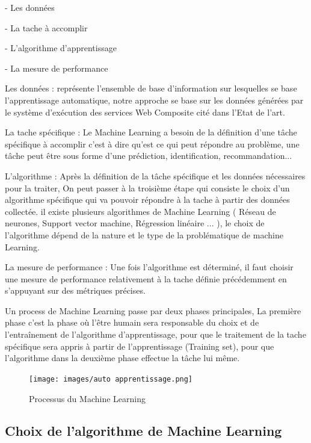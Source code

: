 - Les données

- La tache à accomplir 

- L'algorithme d'apprentissage

- La mesure de performance


Les données : représente l'ensemble de base d'information sur lesquelles se base l'apprentissage automatique, notre approche se base sur les données générées par le système d'exécution des services Web Composite cité dans l'Etat de l'art.

La tache spécifique : Le Machine Learning a besoin de la définition d'une tâche spécifique à accomplir c'est à dire  qu'est ce qui peut répondre au problème, une tâche peut être sous forme d'une prédiction, identification, recommandation... 

L'algorithme : Après la définition de la tâche spécifique et les données nécessaires pour la traiter, On peut passer à la troisième étape qui consiste le choix d'un algorithme spécifique qui va pouvoir répondre à la tache à partir des données collectée. il existe plusieurs algorithmes de Machine Learning ( Réseau de neurones, Support vector machine, Régression linéaire ... ), le choix de l'algorithme dépend de la nature et le type de la problématique de machine Learning.

La mesure de performance : Une fois l'algorithme est déterminé, il faut choisir une mesure de performance relativement à la tache définie précédemment en s'appuyant sur des métriques précises.  

Un process de Machine Learning passe par deux phases principales, La première phase c'est la phase où l'être humain sera responsable du choix et de l'entraînement de l'algorithme d'apprentissage, pour que le traitement de la tache spécifique sera appris à partir de l'apprentissage (Training set), pour que l'algorithme dans la deuxième phase effectue la tâche lui même.

\begin{figure}[H]
\begin{center}
\texttt{[image: images/auto apprentissage.png]}
\end{center}
\caption{Processus du Machine Learning}
\label{fig:6}
\end{figure}

\subsection{Choix de l'algorithme de Machine Learning}

